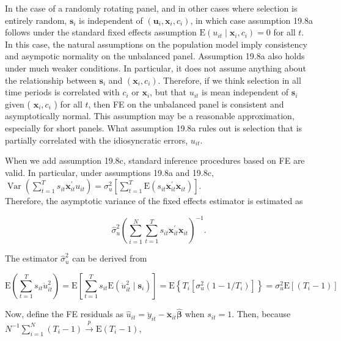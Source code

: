 \documentclass[10pt]{article}
\begin{document}
In the case of a randomly rotating panel, and in other cases where selection is entirely random, $\mathbf{s}_{i}$ is independent of $\left(\mathbf{u}_{i}, \mathbf{x}_{i}, c_{i}\right)$, in which case assumption 19.8a\\
follows under the standard fixed effects assumption $\mathrm{E}\left(u_{i t} \mid \mathbf{x}_{i}, c_{i}\right)=0$ for all $t$. In this case, the natural assumptions on the population model imply consistency and asympotic normality on the unbalanced panel. Assumption 19.8a also holds under much weaker conditions. In particular, it does not assume anything about the relationship between $\mathbf{s}_{i}$ and $\left(\mathbf{x}_{i}, c_{i}\right)$. Therefore, if we think selection in all time periods is correlated with $c_{i}$ or $\mathbf{x}_{i}$, but that $u_{i t}$ is mean independent of $\mathbf{s}_{i}$ given ( $\mathbf{x}_{i}, c_{i}$ ) for all $t$, then FE on the unbalanced panel is consistent and asymptotically normal. This assumption may be a reasonable approximation, especially for short panels. What assumption 19.8a rules out is selection that is partially correlated with the idiosyncratic errors, $u_{i t}$.

When we add assumption 19.8c, standard inference procedures based on FE are valid. In particular, under assumptions 19.8a and 19.8c,\\
$\operatorname{Var}\left(\sum_{t=1}^{T} s_{i t} \ddot{\mathbf{x}}_{i t}^{\prime} u_{i t}\right)=\sigma_{u}^{2}\left[\sum_{t=1}^{T} \mathrm{E}\left(s_{i t} \ddot{\mathbf{x}}_{i t}^{\prime} \ddot{\mathbf{x}}_{i t}\right)\right]$.\\
Therefore, the asymptotic variance of the fixed effects estimator is estimated as


\begin{equation*}
\hat{\sigma}_{u}^{2}\left(\sum_{i=1}^{N} \sum_{t=1}^{T} s_{i t} \ddot{\mathbf{x}}_{i t}^{\prime} \ddot{\mathbf{x}}_{i t}\right)^{-1} . \tag{19.97}
\end{equation*}


The estimator $\hat{\sigma}_{u}^{2}$ can be derived from

$$
\mathrm{E}\left(\sum_{t=1}^{T} s_{i t} \ddot{u}_{i t}^{2}\right)=\mathrm{E}\left[\sum_{t=1}^{T} s_{i t} \mathrm{E}\left(\ddot{u}_{i t}^{2} \mid \mathbf{s}_{i}\right)\right]=\mathrm{E}\left\{T_{i}\left[\sigma_{u}^{2}\left(1-1 / T_{i}\right)\right]\right\}=\sigma_{u}^{2} \mathrm{E}\left[\left(T_{i}-1\right)\right]
$$

Now, define the FE residuals as $\hat{u}_{i t}=\ddot{y}_{i t}-\ddot{\mathbf{x}}_{i t} \hat{\boldsymbol{\beta}}$ when $s_{i t}=1$. Then, because $N^{-1} \sum_{i=1}^{N}\left(T_{i}-1\right) \xrightarrow{p} \mathrm{E}\left(T_{i}-1\right)$,
\end{document}
